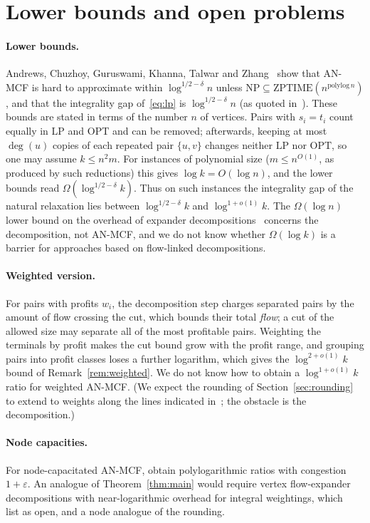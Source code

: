 \documentclass[11pt,letterpaper]{article}
\theoremstyle{definition}
\newcommand{\LP}{\mathrm{LP}}
\newcommand{\OPT}{\mathrm{OPT}}
\newcommand{\eps}{\varepsilon}
\begin{document}
\section{Lower bounds and open problems}\label{sec:discussion}

\paragraph{Lower bounds.}
Andrews, Chuzhoy, Guruswami, Khanna, Talwar and Zhang~\cite{ACGKTZ10} show that AN-MCF is hard
to approximate within $\log^{1/2-\delta}n$ unless
$\mathrm{NP}\subseteq\mathrm{ZPTIME}(n^{\mathrm{polylog}\, n})$, and that the integrality gap
of~\eqref{eq:lp} is $\log^{1/2-\delta}n$ (as quoted in~\cite{CKS13}). These bounds are stated in
terms of the number $n$ of vertices. Pairs with $s_i=t_i$ count equally in $\LP$ and $\OPT$ and
can be removed; afterwards, keeping at most $\deg(u)$ copies of each repeated pair $\{u,v\}$
changes neither $\LP$ nor $\OPT$, so one may assume $k\le n^2m$. For instances of polynomial
size ($m\le n^{O(1)}$, as produced by such reductions) this gives $\log k=O(\log n)$, and the
lower bounds read $\Omega(\log^{1/2-\delta}k)$. Thus on such instances the integrality gap of
the natural relaxation lies between $\log^{1/2-\delta}k$ and $\log^{1+o(1)}k$. The
$\Omega(\log n)$ lower bound on the overhead of expander decompositions~\cite{BJS26} concerns the
decomposition, not AN-MCF, and we do not know whether $\Omega(\log k)$ is a barrier for
approaches based on flow-linked decompositions.

\paragraph{Weighted version.}
For pairs with profits $w_i$, the decomposition step charges separated pairs by the amount of
flow crossing the cut, which bounds their total \emph{flow}; a cut of the allowed size may
separate all of the most profitable pairs. Weighting the terminals by profit makes the cut
bound grow with the profit range, and grouping pairs into profit classes loses a further
logarithm, which gives the $\log^{2+o(1)}k$ bound of Remark~\ref{rem:weighted}. We do not know
how to obtain a $\log^{1+o(1)}k$ ratio for weighted AN-MCF. (We
expect the rounding of Section~\ref{sec:rounding} to extend to weights along the lines
indicated in~\cite{CKS13}; the obstacle is the decomposition.)

\paragraph{Node capacities.}
For node-capacitated AN-MCF, \cite{CKS05} obtain polylogarithmic ratios with congestion
$1+\eps$. An analogue of Theorem~\ref{thm:main} would require vertex flow-expander
decompositions with near-logarithmic overhead for integral weightings, which~\cite{BJS26}
list as open, and a node analogue of the rounding.
\end{document}
